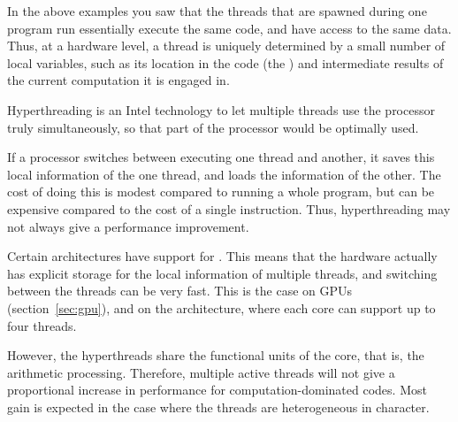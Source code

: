 In the above examples you saw that the threads that are spawned during one 
program run essentially execute the same code, and have access to the same data.
Thus, at a hardware level, a thread is uniquely determined by a small number of
local variables, such as its location in the code (the )
and intermediate results of the current computation it is engaged in.

Hyperthreading is an Intel technology to let multiple threads use the
processor truly simultaneously, so that part of the processor would
be optimally used.

If a processor switches between executing one thread and another, it saves this
local information of the one thread, and loads the information of the other.
The cost of doing this is modest compared to running a whole program, but 
can be expensive compared to the cost of a single instruction. Thus,
hyperthreading may not always give a performance improvement.

Certain architectures have support
for . This means that the hardware actually
has explicit storage for the local information of multiple threads,
and switching between the threads can be very fast. This is the case
on \acp{GPU} (section~\ref{sec:gpu}), and on
the  architecture, where each core can
support up to four threads.

However, the hyperthreads share the functional units of the core,
that is, the arithmetic processing.
Therefore, multiple active threads will not give a proportional increase
in performance for computation-dominated codes.
Most gain is expected in the case where the
threads are heterogeneous in character.


